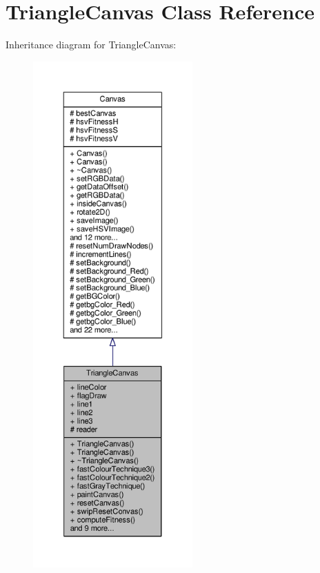 \hypertarget{classTriangleCanvas}{}\section{Triangle\+Canvas Class Reference}
\label{classTriangleCanvas}


Inheritance diagram for Triangle\+Canvas\+:
\nopagebreak
\begin{figure}[H]
\begin{center}
\leavevmode
\includegraphics[height=550pt]{classTriangleCanvas__inherit__graph}
\end{center}
\end{figure}


